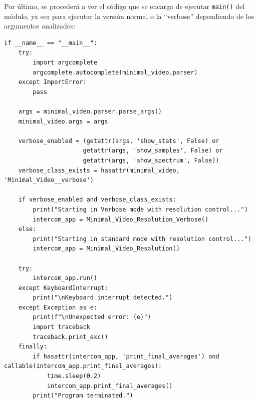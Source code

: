 Por último, se procederá a ver el código que se encarga de ejecutar \texttt{main()} del módulo, ya sea para ejecutar la versión normal o la ``verbose'' dependiendo de los argumentos analizados:
\begin{lstlisting}[style=pythonstyle, caption={Listado del \texttt{main()} del módulo \textit{Minimal\_Video\_Resolution.py}.}, label={lst:bloque_codigo_principal}]
if __name__ == "__main__":
    try:
        import argcomplete
        argcomplete.autocomplete(minimal_video.parser)
    except ImportError:
        pass

    args = minimal_video.parser.parse_args()
    minimal_video.args = args

    verbose_enabled = (getattr(args, 'show_stats', False) or
                      getattr(args, 'show_samples', False) or
                      getattr(args, 'show_spectrum', False))
    verbose_class_exists = hasattr(minimal_video, 'Minimal_Video__verbose')

    if verbose_enabled and verbose_class_exists:
        print("Starting in Verbose mode with resolution control...")
        intercom_app = Minimal_Video_Resolution_Verbose()
    else:
        print("Starting in standard mode with resolution control...")
        intercom_app = Minimal_Video_Resolution()

    try:
        intercom_app.run()
    except KeyboardInterrupt:
        print("\nKeyboard interrupt detected.")
    except Exception as e:
        print(f"\nUnexpected error: {e}")
        import traceback
        traceback.print_exc()
    finally:
        if hasattr(intercom_app, 'print_final_averages') and callable(intercom_app.print_final_averages):
            time.sleep(0.2)
            intercom_app.print_final_averages()
        print("Program terminated.")
\end{lstlisting}
\vspace{\baselineskip}

